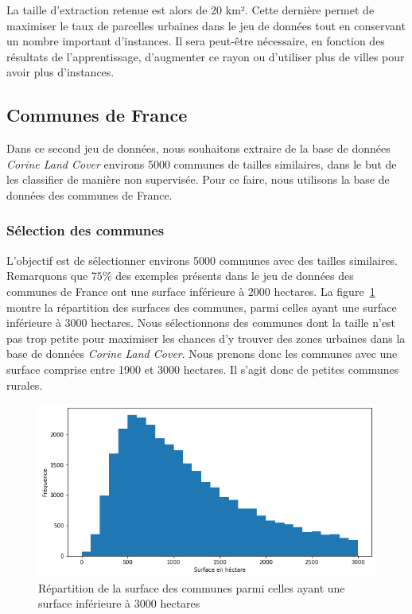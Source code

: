 La taille d'extraction retenue est alors de 20 km².
Cette dernière permet de maximiser le taux de parcelles urbaines dans le jeu de données tout en conservant un nombre important d'instances.
Il sera peut-être nécessaire, en fonction des résultats de l'apprentissage, d'augmenter ce rayon ou d'utiliser plus de villes pour avoir plus d'instances.

\subsection{Communes de France}

Dans ce second jeu de données, nous souhaitons extraire de la base de données \emph{Corine Land Cover} environs 5000 communes de tailles similaires, dans le but de les classifier de manière non supervisée.
Pour ce faire, nous utilisons la base de données des communes de France.

\subsubsection{Sélection des communes}

L'objectif est de sélectionner environs 5000 communes avec des tailles similaires.
Remarquons que $75\%$ des exemples présents dans le jeu de données des communes de France ont une surface inférieure à $2000$ hectares.
La figure~\ref{fig:surf-communes} montre la répartition des surfaces des communes, parmi celles ayant une surface inférieure à $3000$ hectares.
Nous sélectionnons des communes dont la taille n'est pas trop petite pour maximiser les chances d'y trouver des zones urbaines dans la base de données \emph{Corine Land Cover}.
Nous prenons donc les communes avec une surface comprise entre 1900 et 3000 hectares.
Il s'agit donc de petites communes rurales.

\begin{figure}[!h]
    \centering
    \includegraphics[scale=0.5]{images/surf-communes}
    \caption{Répartition de la surface des communes parmi celles ayant une surface inférieure à 3000 hectares}
    \label{fig:surf-communes}
\end{figure}

